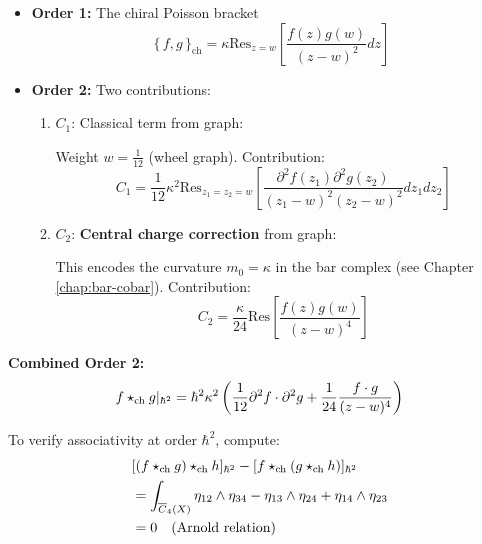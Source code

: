 \begin{itemize}
\item \textbf{Order 1:} The chiral Poisson bracket
$$\{\,f,g\,\}_{\text{ch}} = \kappa \text{Res}_{z=w}\left[\frac{f(z)g(w)}{(z-w)^2}dz\right]$$

\item \textbf{Order 2:} Two contributions:
\begin{enumerate}
\item $C_1$: Classical term from graph:
\begin{center}
\end{center}
Weight $w = \frac{1}{12}$ (wheel graph). Contribution:
$$C_1 = \frac{1}{12} \kappa^2 \text{Res}_{z_1=z_2=w}\left[\frac{\partial^2 f(z_1) \partial^2 g(z_2)}{(z_1-w)^2(z_2-w)^2}dz_1 dz_2\right]$$

\item $C_2$: \textbf{Central charge correction} from graph:
\begin{center}
\end{center}
This encodes the curvature $m_0 = \kappa$ in the bar complex (see Chapter \ref{chap:bar-cobar}). Contribution:
$$C_2 = \frac{\kappa}{24} \text{Res}\left[\frac{f(z)g(w)}{(z-w)^4}\right]$$
\end{enumerate}
\end{itemize}

\textbf{Combined Order 2:}
$$f \star_{\text{ch}} g|_{\hbar^2} = \hbar^2 \kappa^2 \left(\frac{1}{12}\partial^2 f \cdot \partial^2 g + \frac{1}{24}\frac{f \cdot g}{(z-w)^4}\right)$$

\begin{verification}
To verify associativity at order $\hbar^2$, compute:
\begin{align}
&[(f \star_{\text{ch}} g) \star_{\text{ch}} h]_{\hbar^2} - [f \star_{\text{ch}} (g \star_{\text{ch}} h)]_{\hbar^2} \\
&= \int_{\overline{C}_{4}(X)} \eta_{12} \wedge \eta_{34} - \eta_{13} \wedge \eta_{24} + \eta_{14} \wedge \eta_{23} \\
&= 0 \quad \text{(Arnold relation)}
\end{align}
\end{verification}


